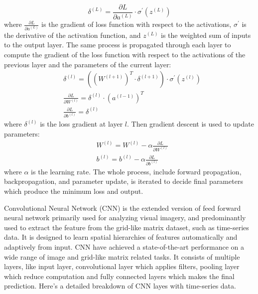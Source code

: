 \documentclass[12pt,a4paper,english
]{tunithesis}
\begin{document}
\begin{equation*}
    \delta^{(L)}=\frac{\partial L}{\partial a^{(L)}} \cdot \sigma^{\prime}\left(z^{(L)}\right)
\end{equation*}
where $\frac{\partial L}{\partial a^{(L)}}$ is the gradient of loss function with respect to the activations, $\sigma^{\prime}$ is the derivative of the activation function, and $z^{(L)}$ is the weighted sum of inputs to the output layer. The same process is propagated through each layer to compute the gradient of the loss function with respect to the activations of the previous layer and the parameters of the current layer:
\begin{equation*}
    \begin{aligned}
& \delta^{(l)}=\left(\left(W^{(l+1)}\right)^T \cdot \delta^{(l+1)}\right) \cdot \sigma^{\prime}\left(z^{(l)}\right) \\
& \frac{\partial L}{\partial W^{(l)}}=\delta^{(l)} \cdot\left(a^{(l-1)}\right)^T \\
& \frac{\partial L}{\partial b^{(l)}}=\delta^{(l)}
\end{aligned}
\end{equation*}
where $\delta^{(l)}$ is the loss gradient at layer $l$. Then gradient descent is used to update parameters:
\begin{equation*}
    \begin{aligned}
& W^{(l)}=W^{(l)}-\alpha \frac{\partial L}{\partial W^{(l)}} \\
& b^{(l)}=b^{(l)}-\alpha \frac{\partial L}{\partial b^{(l)}}
\end{aligned}
\end{equation*}
where $\alpha$ is the learning rate. The whole process, include forward propagation, backpropagation, and parameter update, is iterated to decide final parameters which produce the minimum loss and output.

Convolutional Neural Network (CNN) is the extended version of feed forward neural network primarily used for analyzing visual imagery, and predominantly used to extract the feature from the grid-like matrix dataset, such as time-series data. It is designed to learn spatial hierarchies of features automatically and adaptively from input. CNN have achieved a state-of-the-art performance on a wide range of image and grid-like matrix related tasks. It consists of multiple layers, like input layer, convolutional layer which applies filters, pooling layer which reduce computation and fully connected layers which makes the final prediction. Here's a detailed breakdown of CNN layes with time-series data.
\end{document}
